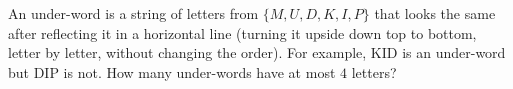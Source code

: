 An under-word is a string of letters from $\{M,U,D,K,I,P\}$ that looks the same after reflecting it in a horizontal line (turning it upside down top to bottom, letter by letter, without changing the order). For example, KID is an under-word but DIP is not. How many under-words have at most $4$ letters?
